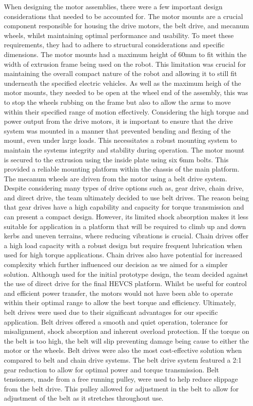 \documentclass [12pt]{article}
\begin{document}
When designing the motor assemblies, there were a few important design considerations that needed to be accounted for. The motor mounts are a crucial component responsible for housing the drive motors, the belt drive, and mecanum wheels, whilst maintaining optimal performance and usability. To meet these requirements, they had to adhere to structural considerations and specific dimensions.
The motor mounts had a maximum height of 60mm to fit within the width of extrusion frame being used on the robot. This limitation was crucial for maintaining the overall compact nature of the robot and allowing it to still fit underneath the specified electric vehicles. As well as the maximum heigh of the motor mounts, they needed to be open at the wheel end of the assembly, this was to stop the wheels rubbing on the frame but also to allow the arms to move within their specified range of motion effectively.
Considering the high torque and power output from the drive motors, it is important to ensure that the drive system was mounted in a manner that prevented bending and flexing of the mount, even under large loads. This necessitates a robust mounting system to maintain the systems integrity and stability during operation. The motor mount is secured to the extrusion using the inside plate using six 6mm bolts. This provided a reliable mounting platform within the chassis of the main platform.
The mecanum wheels are driven from the motor using a belt drive system. Despite considering many types of drive options such as, gear drive, chain drive, and direct drive, the team ultimately decided to use belt drives. The reason being that gear drives have a high capability and capacity for torque transmission and can present a compact design. However, its limited shock absorption makes it less suitable for application in a platform that will be required to climb up and down kerbs and uneven terrains, where reducing vibrations is crucial. Chain drives offer a high load capacity with a robust design but require frequent lubrication when used for high torque applications. Chain drives also have potential for increased complexity which further influenced our decision as we aimed for a simpler solution. Although used for the initial prototype design, the team decided against the use of direct drive for the final HEVCS platform. Whilst be useful for control and efficient power transfer, the motors would not have been able to operate within their optimal range to allow the best torque and efficiency. Ultimately, belt drives were used due to their significant advantages for our specific application. Belt drives offered a smooth and quiet operation, tolerance for misalignment, shock absorption and inherent overload protection. If the torque on the belt is too high, the belt will slip preventing damage being cause to either the motor or the wheels. Belt drives were also the most cost-effective solution when compared to belt and chain drive systems. The belt drive system featured a 2:1 gear reduction to allow for optimal power and torque transmission. Belt tensioners, made from a free running pulley, were used to help reduce slippage from the belt drive. This pulley allowed for adjustment in the belt to allow for adjustment of the belt as it stretches throughout use.
\end{document}
